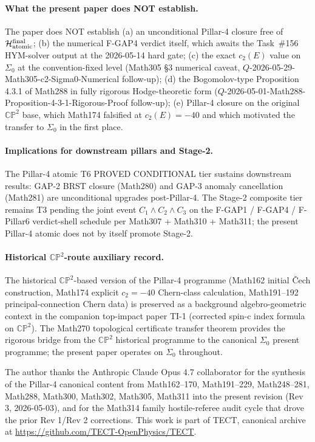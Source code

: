 \paragraph{What the present paper does NOT establish.}
The paper does NOT establish (a) an unconditional Pillar-4 closure
free of $\mathcal{H}_{\rm atomic}^{\rm final}$; (b) the numerical
F-GAP4 verdict itself, which awaits the Task~\#156 HYM-solver output
at the 2026-05-14 hard gate; (c) the exact $c_2(E)$ value on
$\Sigma_0$ at the convention-fixed level (Math305 \S3 numerical
caveat, $Q$-2026-05-29-Math305-c2-Sigma0-Numerical follow-up);
(d) the Bogomolov-type Proposition 4.3.1 of Math288 in fully
rigorous Hodge-theoretic form
($Q$-2026-05-01-Math288-Proposition-4-3-1-Rigorous-Proof
follow-up); (e) Pillar-4 closure on the original $\mathbb{CP}^2$
base, which Math174 falsified at $c_2(E) = -40$ and which motivated
the transfer to $\Sigma_0$ in the first place.

\paragraph{Implications for downstream pillars and Stage-2.}
The Pillar-4 atomic T6 PROVED CONDITIONAL tier sustains downstream
results: GAP-2 BRST closure (Math280) and GAP-3 anomaly cancellation
(Math281) are unconditional upgrades post-Pillar-4. The Stage-2
composite tier remains T3 pending the joint event $C_1 \wedge C_2
\wedge C_3$ on the F-GAP1 / F-GAP4 / F-Pillar6 verdict-shell
schedule per Math307 + Math310 + Math311; the present Pillar-4
atomic does not by itself promote Stage-2.

\paragraph{Historical $\mathbb{CP}^2$-route auxiliary record.}
The historical $\mathbb{CP}^2$-based version of the Pillar-4
programme (Math162 initial \v{C}ech construction, Math174 explicit
$c_2 = -40$ Chern-class calculation, Math191--192 principal-connection
Chern data) is preserved as a background algebro-geometric context
in the companion top-impact paper TI-1 (corrected
spin-c index formula on $\mathbb{CP}^2$). The Math270 topological
certificate transfer theorem provides the rigorous bridge from the
$\mathbb{CP}^2$ historical programme to the canonical $\Sigma_0$
present programme; the present paper operates on $\Sigma_0$
throughout.

\begin{acknowledgments}
The author thanks the Anthropic Claude Opus 4.7 collaborator for the
synthesis of the Pillar-4 canonical content from Math162--170,
Math191--229, Math248--281, Math288, Math300, Math302, Math305,
Math311 into the present revision (Rev 3, 2026-05-03), and for the
Math314 family hostile-referee audit cycle that drove the prior
Rev 1/Rev 2 corrections. This work is part of TECT, canonical
archive at \url{https://github.com/TECT-OpenPhysics/TECT}.
\end{acknowledgments}





